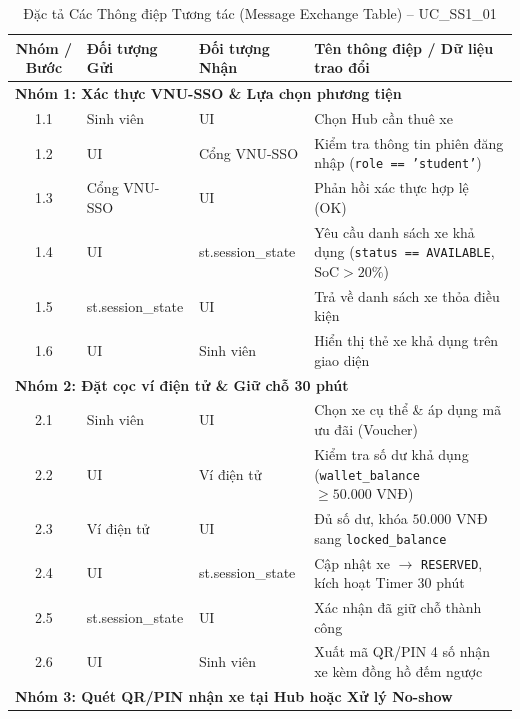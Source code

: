\documentclass[12pt,a4paper]{article}
\begin{document}
\begin{table}[H]
    \centering
    \small
    \renewcommand{\arraystretch}{1.25}
    \caption{Đặc tả Các Thông điệp Tương tác (Message Exchange Table) -- UC\_SS1\_01}
    \label{tab:msg-ss1-01}
    \begin{tabularx}{\textwidth}{|c|>{\raggedright\arraybackslash}p{2.6cm}|>{\raggedright\arraybackslash}p{2.6cm}|>{\raggedright\arraybackslash}X|}
        \hline
        \textbf{Nhóm / Bước} & \textbf{Đối tượng Gửi} & \textbf{Đối tượng Nhận} & \textbf{Tên thông điệp / Dữ liệu trao đổi} \\
        \hline
        \multicolumn{4}{|l|}{\textbf{Nhóm 1: Xác thực VNU-SSO \& Lựa chọn phương tiện}} \\
        \hline
        1.1 & Sinh viên & UI & Chọn Hub cần thuê xe \\
        1.2 & UI & Cổng VNU-SSO & Kiểm tra thông tin phiên đăng nhập (\texttt{role == 'student'}) \\
        1.3 & Cổng VNU-SSO & UI & Phản hồi xác thực hợp lệ (OK) \\
        1.4 & UI & st.session\_state & Yêu cầu danh sách xe khả dụng (\texttt{status == AVAILABLE}, $\text{SoC} > 20\%$) \\
        1.5 & st.session\_state & UI & Trả về danh sách xe thỏa điều kiện \\
        1.6 & UI & Sinh viên & Hiển thị thẻ xe khả dụng trên giao diện \\
        \hline
        \multicolumn{4}{|l|}{\textbf{Nhóm 2: Đặt cọc ví điện tử \& Giữ chỗ 30 phút}} \\
        \hline
        2.1 & Sinh viên & UI & Chọn xe cụ thể \& áp dụng mã ưu đãi (Voucher) \\
        2.2 & UI & Ví điện tử & Kiểm tra số dư khả dụng (\texttt{wallet\_balance} $\ge 50.000\text{ VNĐ}$) \\
        2.3 & Ví điện tử & UI & Đủ số dư, khóa $50.000\text{ VNĐ}$ sang \texttt{locked\_balance} \\
        2.4 & UI & st.session\_state & Cập nhật xe $\rightarrow$ \texttt{RESERVED}, kích hoạt Timer 30 phút \\
        2.5 & st.session\_state & UI & Xác nhận đã giữ chỗ thành công \\
        2.6 & UI & Sinh viên & Xuất mã QR/PIN 4 số nhận xe kèm đồng hồ đếm ngược \\
        \hline
        \multicolumn{4}{|l|}{\textbf{Nhóm 3: Quét QR/PIN nhận xe tại Hub hoặc Xử lý No-show}} \\

\end{tabularx}
\end{table}
\end{document}

